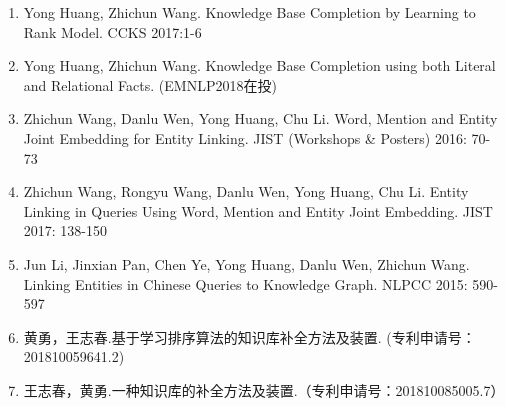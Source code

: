 \begin{paper}
\begin{enumerate}
  \item Yong Huang, Zhichun Wang. Knowledge Base Completion by Learning to Rank Model. CCKS 2017:1-6
  \item Yong Huang, Zhichun Wang. Knowledge Base Completion using both Literal and Relational Facts. (EMNLP2018在投)
  \item Zhichun Wang, Danlu Wen, Yong Huang, Chu Li.
Word, Mention and Entity Joint Embedding for Entity Linking. JIST (Workshops & Posters) 2016: 70-73
 \item Zhichun Wang, Rongyu Wang, Danlu Wen, Yong Huang, Chu Li.
Entity Linking in Queries Using Word, Mention and Entity Joint Embedding. JIST 2017: 138-150
  \item Jun Li, Jinxian Pan, Chen Ye, Yong Huang, Danlu Wen, Zhichun Wang.
  Linking Entities in Chinese Queries to Knowledge Graph. NLPCC 2015: 590-597
  \item 黄勇，王志春.基于学习排序算法的知识库补全方法及装置. (专利申请号：201810059641.2)
  \item 王志春，黄勇.一种知识库的补全方法及装置.（专利申请号：201810085005.7）
  \end{enumerate}
\end{paper}
